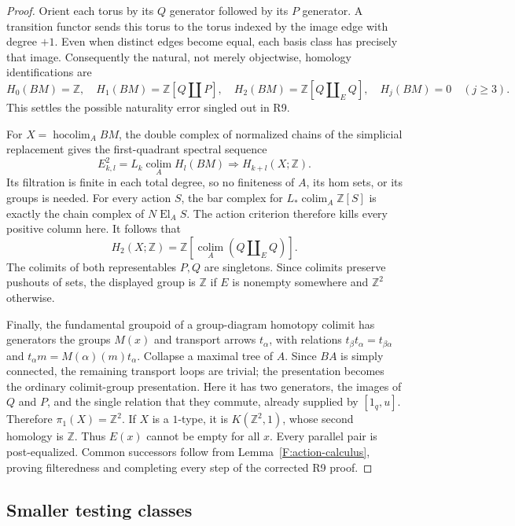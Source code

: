 \documentclass[11pt,a4paper]{article}
\theoremstyle{definition}
\theoremstyle{remark}
\newcommand{\El}{\operatorname{El}}
\newcommand{\colim}{\operatorname*{colim}}
\begin{document}
\begin{proof}
Orient each torus by its $Q$ generator followed by its $P$ generator.
A transition functor sends this torus to the torus indexed by the
image edge with degree $+1$.  Even when distinct edges become equal,
each basis class has precisely that image.  Consequently the natural,
not merely objectwise, homology identifications are
\[
 H_0(BM)=\mathbb Z,
 \quad H_1(BM)=\mathbb Z[Q\amalg P],
 \quad H_2(BM)=\mathbb Z[Q\amalg_E Q],
 \quad H_j(BM)=0\quad(j\geq3).
\]
This settles the possible naturality error singled out in R9.

For $X=\operatorname{hocolim}_A BM$, the double complex of normalized
chains of the simplicial replacement gives the first-quadrant spectral
sequence
\[
 E^2_{k,l}=L_k\colim_A H_l(BM)\Longrightarrow H_{k+l}(X;\mathbb Z).
\]
Its filtration is finite in each total degree, so no finiteness of
$A$, its hom sets, or its groups is needed.  For every action $S$,
the bar complex for $L_*\colim_A\mathbb Z[S]$ is exactly the chain
complex of $N\El_A S$.  The action criterion therefore kills every
positive column here.  It follows that
\[
 H_2(X;\mathbb Z)=\mathbb Z[\colim_A(Q\amalg_E Q)].
\]
The colimits of both representables $P,Q$ are singletons.  Since
colimits preserve pushouts of sets, the displayed group is
$\mathbb Z$ if $E$ is nonempty somewhere and $\mathbb Z^2$ otherwise.

Finally, the fundamental groupoid of a group-diagram homotopy colimit
has generators the groups $M(x)$ and transport arrows $t_\alpha$,
with relations
$t_\beta t_\alpha=t_{\beta\alpha}$ and
$t_\alpha m=M(\alpha)(m)t_\alpha$.
Collapse a maximal tree of $A$.  Since $BA$ is simply connected, the
remaining transport loops are trivial; the presentation becomes the
ordinary colimit-group presentation.  Here it has two generators,
the images of $Q$ and $P$, and the single relation that they commute,
already supplied by $[1_q,u]$.  Therefore $\pi_1(X)=\mathbb Z^2$.
If $X$ is a $1$-type, it is $K(\mathbb Z^2,1)$, whose second homology
is $\mathbb Z$.  Thus $E(x)$ cannot be empty for all $x$.
Every parallel pair is post-equalized.  Common successors follow from
Lemma~\ref{F:action-calculus}, proving filteredness and completing every
step of the corrected R9 proof.
\end{proof}

\subsection{Smaller testing classes}
\end{document}
